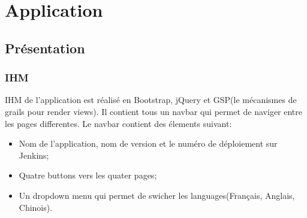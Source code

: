 \section{Application}
\subsection{Présentation}

\subsubsection{IHM}
IHM de l'application est réalisé en Bootstrap, jQuery et GSP(le mécanismes de grails pour render views).
Il contient tous un navbar qui permet de naviger entre les pages differentes.
Le navbar contient des élements suivant:
\begin{itemize}
 \item Nom de l'application, nom de version et le numéro de déploiement sur Jenkins;
 \item Quatre buttons vers les quater pages;
 \item Un dropdown menu qui permet de swicher les languages(Français, Anglais, Chinois).
\end{itemize}

